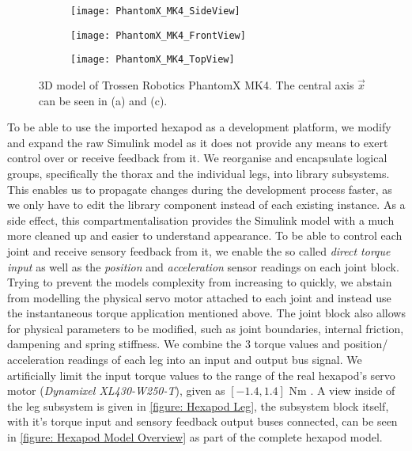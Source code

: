 \begin{figure}[h]
	\begin{subfigure}{.5\textwidth} %
		\centering
		\texttt{[image: PhantomX\_MK4\_SideView]}  %
		\caption{}
		\label{figure: PhantomX Side View}
	\end{subfigure}
	\begin{subfigure}{.5\textwidth}
		\centering
		\texttt{[image: PhantomX\_MK4\_FrontView]}  
		\caption{}
		\label{figure: PhantomX Front View}
	\end{subfigure}
	
	\label{fig:fig}
	\begin{subfigure}{\textwidth}
		\centering
		\texttt{[image: PhantomX\_MK4\_TopView]}   %
		\caption{}
		\label{figure: PhantomX Top View}
	\end{subfigure}
	\caption[Trossen Robotics PhantomX MKIV]{3D model of Trossen Robotics PhantomX MK4. The central axis $\vec{x}$ can be seen in (a) and (c).}
	\label{figure: PhantomX 3D model}
\end{figure}

To be able to use the imported hexapod as a development platform, we modify and expand the raw Simulink model as it does not provide any means to exert control over or receive feedback from it.
We reorganise and encapsulate logical groups, specifically the thorax and the individual legs, into library subsystems.
This enables us to propagate changes during the development process faster, as we only have to edit the library component instead of each existing instance.
As a side effect, this compartmentalisation provides the Simulink model with a much more cleaned up and easier to understand appearance.
To be able to control each joint and receive sensory feedback from it, we enable the so called \textit{direct torque input} as well as the \textit{position} and \textit{acceleration} sensor readings on each joint block.
Trying to prevent the models complexity from increasing to quickly, we abstain from modelling the physical servo motor attached to each joint and instead use the instantaneous torque application mentioned above.
The joint block also allows for physical parameters to be modified, such as joint boundaries, internal friction, dampening and spring stiffness.
We combine the 3 torque values and position/ acceleration readings of each leg into an input and output bus signal.
We artificially limit the input torque values to the range of the real hexapod's servo motor (\emph{Dynamixel XL430-W250-T}), given as $ [-1.4,1.4]$ Nm \parencite{PhantomX_MKIII}.
A view inside of the leg subsystem is given in \ref{figure: Hexapod Leg}, the subsystem block itself, with it's torque input and sensory feedback output buses connected, can be seen in \ref{figure: Hexapod Model Overview} as part of the complete hexapod model.

